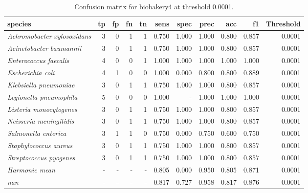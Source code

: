 \begin{table}[H]
\centering
\begin{tabular}{lrrrrrrrrrr}
\hline
\textbf{species} & \textbf{tp} & \textbf{fp} & \textbf{fn} & \textbf{tn} & \textbf{sens} & \textbf{spec} & \textbf{prec} & \textbf{acc} & \textbf{f1} & \textbf{Threshold} \\
\hline
\itshape Achromobacter xylosoxidans & 3 & 0 & 1 & 1 & 0.750 & 1.000 & 1.000 & 0.800 & 0.857 & 0.0001 \\
\itshape Acinetobacter baumannii & 3 & 0 & 1 & 1 & 0.750 & 1.000 & 1.000 & 0.800 & 0.857 & 0.0001 \\
\itshape Enterococcus faecalis & 4 & 0 & 0 & 1 & 1.000 & 1.000 & 1.000 & 1.000 & 1.000 & 0.0001 \\
\itshape Escherichia coli & 4 & 1 & 0 & 0 & 1.000 & 0.000 & 0.800 & 0.800 & 0.889 & 0.0001 \\
\itshape Klebsiella pneumoniae & 3 & 0 & 1 & 1 & 0.750 & 1.000 & 1.000 & 0.800 & 0.857 & 0.0001 \\
\itshape Legionella pneumophila & 5 & 0 & 0 & 0 & 1.000 & - & 1.000 & 1.000 & 1.000 & 0.0001 \\
\itshape Listeria monocytogenes & 3 & 0 & 1 & 1 & 0.750 & 1.000 & 1.000 & 0.800 & 0.857 & 0.0001 \\
\itshape Neisseria meningitidis & 3 & 0 & 1 & 1 & 0.750 & 1.000 & 1.000 & 0.800 & 0.857 & 0.0001 \\
\itshape Salmonella enterica & 3 & 1 & 1 & 0 & 0.750 & 0.000 & 0.750 & 0.600 & 0.750 & 0.0001 \\
\itshape Staphylococcus aureus & 3 & 0 & 1 & 1 & 0.750 & 1.000 & 1.000 & 0.800 & 0.857 & 0.0001 \\
\itshape Streptococcus pyogenes & 3 & 0 & 1 & 1 & 0.750 & 1.000 & 1.000 & 0.800 & 0.857 & 0.0001 \\
\itshape Harmonic mean & - & - & - & - & 0.805 & 0.000 & 0.950 & 0.805 & 0.871 & 0.0001 \\
\itshape nan & - & - & - & - & 0.817 & 0.727 & 0.958 & 0.817 & 0.876 & 0.0001 \\
\end{tabular}
\caption{Confusion matrix for biobakery4 at threshold 0.0001.}
\label{tab:conf_biobakery4_0.0001}
\end{table}
